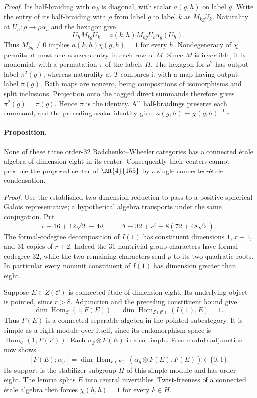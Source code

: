 \emph{Proof.}
Its half-braiding with $\alpha_h$ is diagonal, with scalar $a(g,h)$ on
label $g$. Write the entry of its half-braiding with $\rho$ from label
$g$ to label $k$ as $M_{kg}U_k$. Naturality at
$U_h:\rho\to\rho\alpha_h$ and the hexagon give
\[
 U_hM_{kg}U_k=a(k,h)M_{kg}U_k\alpha_g(U_h).
\]
Thus $M_{kg}\ne0$ implies $a(k,h)\chi(g,h)=1$ for every $h$.
Nondegeneracy of $\chi$ permits at most one nonzero entry in each row
of $M$. Since $M$ is invertible, it is monomial, with a permutation
$\pi$ of the labels $H$. The hexagon for $\rho^2$ has output label
$\pi^2(g)$, whereas naturality at $T$ compares it with a map having
output label $\pi(g)$. Both maps are nonzero, being compositions of
isomorphisms and split inclusions. Projection onto the tagged direct
summands therefore gives $\pi^2(g)=\pi(g)$. Hence $\pi$ is the identity.
All half-braidings preserve each summand, and the preceding scalar
identity gives $a(g,h)=\chi(g,h)^{-1}$.\hfill$\square$

\paragraph{Proposition.}
None of these three order-$32$ Radchenko--Wheeler categories has a
connected \'etale algebra of dimension eight in its center. Consequently
their centers cannot produce the proposed center of $\RR{4}{155}$ by a
single connected-\'etale condensation.

\emph{Proof.}
Use the established two-dimension reduction to pass to a positive
spherical Galois representative; a hypothetical algebra transports under
the same conjugation. Put
\[
 r=16+12\sqrt2=4d,\qquad
 \Delta=32+r^2=8(72+48\sqrt2).
\]
The formal-codegree decomposition of $I(1)$ has constituent dimensions
$1$, $r+1$, and $31$ copies of $r+2$. Indeed the $31$ nontrivial group
characters have formal codegree $32$, while the two remaining characters
send $\rho$ to its two quadratic roots. In particular every nonunit
constituent of $I(1)$ has dimension greater than eight.

Suppose $E\in Z(\mathcal C)$ is connected \'etale of dimension eight.
Its underlying object is pointed, since $r>8$. Adjunction and the
preceding constituent bound give
\[
 \dim\operatorname{Hom}_{\mathcal C}(1,F(E))
 =\dim\operatorname{Hom}_{Z(\mathcal C)}(I(1),E)=1.
\]
Thus $F(E)$ is a connected separable algebra in the pointed subcategory.
It is simple as a right module over itself, since its endomorphism space
is $\operatorname{Hom}_{\mathcal C}(1,F(E))$. Each $\alpha_g\otimes F(E)$
is also simple. Free-module adjunction now shows
\[
 [F(E):\alpha_g]
 =\dim\operatorname{Hom}_{F(E)}(\alpha_g\otimes F(E),F(E))\in\{0,1\}.
\]
Its support is the stabilizer subgroup $H$ of this simple module and has
order eight. The lemma splits $E$ into central invertibles. Twist-freeness
of a connected \'etale algebra then forces $\chi(h,h)=1$ for every
$h\in H$.


